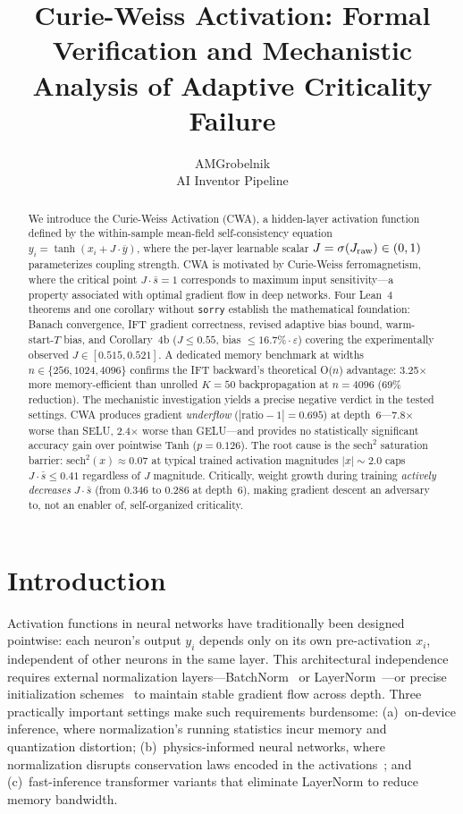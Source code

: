 \documentclass[11pt,twocolumn,letterpaper]{article}
\title{\textbf{Curie-Weiss Activation: Formal Verification and Mechanistic\\
Analysis of Adaptive Criticality Failure}}
\author{
  AMGrobelnik \\
  AI Inventor Pipeline
}
\date{}
\begin{document}
\maketitle

\begin{abstract}
We introduce the Curie-Weiss Activation (CWA), a hidden-layer activation function defined by the within-sample mean-field
self-consistency equation $y_i = \tanh(x_i + J\cdot\overline{y})$, where the per-layer learnable scalar $J = \sigma(J_{\rm
raw}) \in (0,1)$ parameterizes coupling strength. CWA is motivated by Curie-Weiss ferromagnetism, where the critical point
$J\cdot\bar{s} = 1$ corresponds to maximum input sensitivity---a property associated with optimal gradient flow in deep
networks. Four Lean~4 theorems and one corollary without \texttt{sorry} establish the mathematical foundation: Banach convergence,
IFT gradient correctness, revised adaptive bias bound, warm-start-$T$ bias, and Corollary~4b ($J \leq 0.55$, bias $\leq
16.7\%\cdot\varepsilon$) covering the experimentally observed $J \in [0.515, 0.521]$. A dedicated memory benchmark at widths
$n \in \{256, 1024, 4096\}$ confirms the IFT backward's theoretical O($n$) advantage: 3.25$\times$ more memory-efficient
than unrolled $K=50$ backpropagation at $n = 4096$ (69\% reduction). The mechanistic investigation yields a precise negative
verdict in the tested settings. CWA produces gradient \emph{underflow} ($|\text{ratio}-1| = 0.695$) at depth~6---7.8$\times$
worse than SELU, 2.4$\times$ worse than GELU---and provides no statistically significant accuracy gain over pointwise Tanh
($p = 0.126$). The root cause is the $\text{sech}^2$ saturation barrier: $\text{sech}^2(x) \approx 0.07$ at typical trained
activation magnitudes $|x| \sim 2.0$ caps $J\cdot\bar{s} \leq 0.41$ regardless of $J$ magnitude. Critically, weight growth
during training \emph{actively decreases} $J\cdot\bar{s}$ (from 0.346 to 0.286 at depth~6), making gradient descent an
adversary to, not an enabler of, self-organized criticality.
\end{abstract}

\section{Introduction}

Activation functions in neural networks have traditionally been designed pointwise: each neuron's output $y_i$ depends only
on its own pre-activation $x_i$, independent of other neurons in the same layer. This architectural independence requires
external normalization layers---BatchNorm~\cite{Ioffe2015} or LayerNorm~\cite{Ba2016}---or precise initialization
schemes~\cite{Poole2016,Yang2017} to maintain stable gradient flow across depth. Three practically important settings make
such requirements burdensome: (a)~on-device inference, where normalization's running statistics incur memory and quantization
distortion; (b)~physics-informed neural networks, where normalization disrupts conservation laws encoded in the
activations~\cite{Lesser2026}; and (c)~fast-inference transformer variants that eliminate LayerNorm to reduce memory bandwidth.
\end{document}
